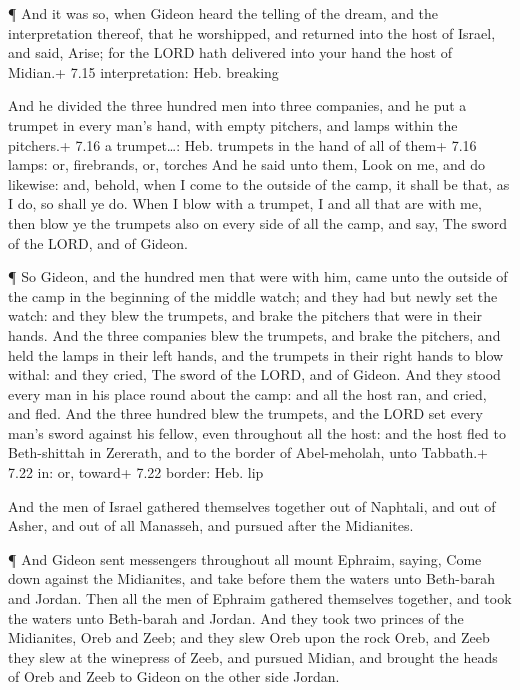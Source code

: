  ¶ And it was so, when Gideon heard the telling of the
dream, and the interpretation thereof, that he worshipped, and returned
into the host of Israel, and said, Arise; for the LORD hath delivered
into your hand the host of Midian.+ 7.15 interpretation: Heb. breaking

 And he divided the three hundred men into three companies,
and he put a trumpet in every man's hand, with empty pitchers, and lamps
within the pitchers.+ 7.16 a trumpet\ldots: Heb. trumpets in the hand of
all of them+ 7.16 lamps: or, firebrands, or, torches  And
he said unto them, Look on me, and do likewise: and, behold, when I come
to the outside of the camp, it shall be that, as I do, so shall ye do.
 When I blow with a trumpet, I and all that are with me,
then blow ye the trumpets also on every side of all the camp, and say,
The sword of the LORD, and of Gideon.

 ¶ So Gideon, and the hundred men that were with him, came
unto the outside of the camp in the beginning of the middle watch; and
they had but newly set the watch: and they blew the trumpets, and brake
the pitchers that were in their hands.  And the three
companies blew the trumpets, and brake the pitchers, and held the lamps
in their left hands, and the trumpets in their right hands to blow
withal: and they cried, The sword of the LORD, and of Gideon.
 And they stood every man in his place round about the
camp: and all the host ran, and cried, and fled.  And the
three hundred blew the trumpets, and the LORD set every man's sword
against his fellow, even throughout all the host: and the host fled to
Beth-shittah in Zererath, and to the border of Abel-meholah, unto
Tabbath.+ 7.22 in: or, toward+ 7.22 border: Heb. lip

 And the men of Israel gathered themselves together out of
Naphtali, and out of Asher, and out of all Manasseh, and pursued after
the Midianites.

 ¶ And Gideon sent messengers throughout all mount Ephraim,
saying, Come down against the Midianites, and take before them the
waters unto Beth-barah and Jordan. Then all the men of Ephraim gathered
themselves together, and took the waters unto Beth-barah and Jordan.
 And they took two princes of the Midianites, Oreb and
Zeeb; and they slew Oreb upon the rock Oreb, and Zeeb they slew at the
winepress of Zeeb, and pursued Midian, and brought the heads of Oreb and
Zeeb to Gideon on the other side Jordan.

